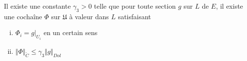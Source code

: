 \documentclass[a4paper,11pt,draft,makeidx,twocolumn]{amsart}
\begin{document}
\begin{lem}
Il existe une constante $\gamma_3>0$ telle que pour toute section $g$ sur $L$ de $E$, il existe une cochaîne $\Phi$ sur $\mathfrak{U}$ à valeur dans $L$ satisfaisant
\begin{enumerate}[(i)]
\item $\Phi_i = g\vert_{U_i}$ en un certain sens
\item $\Vert \Phi \Vert_{\check{C}} \leq \gamma_3 \Vert g \Vert_{Dol}$
\end{enumerate}
\end{lem}
\end{document}
